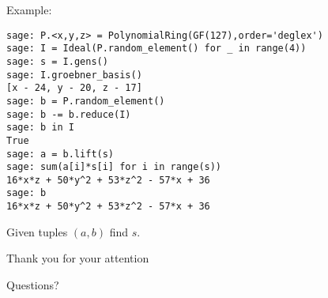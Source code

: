 \documentclass[10pt]{beamer}
\begin{document}
\begin{frame}
\framebreak

Example:

\begin{lstlisting}
sage: P.<x,y,z> = PolynomialRing(GF(127),order='deglex')
sage: I = Ideal(P.random_element() for _ in range(4))
sage: s = I.gens()
sage: I.groebner_basis()                                       
[x - 24, y - 20, z - 17]
sage: b = P.random_element() 
sage: b -= b.reduce(I)
sage: b in I
True
sage: a = b.lift(s)
sage: sum(a[i]*s[i] for i in range(s))
16*x*z + 50*y^2 + 53*z^2 - 57*x + 36
sage: b
16*x*z + 50*y^2 + 53*z^2 - 57*x + 36
\end{lstlisting}

Given tuples $(a,b)$ find $s$.

\end{frame}

\begin{frame}{Thank you for your attention}
\begin{center}
\begin{Huge}

\begin{center}
Questions?
\end{center}
\end{Huge}
\end{center}
\end{frame}
\end{document}
